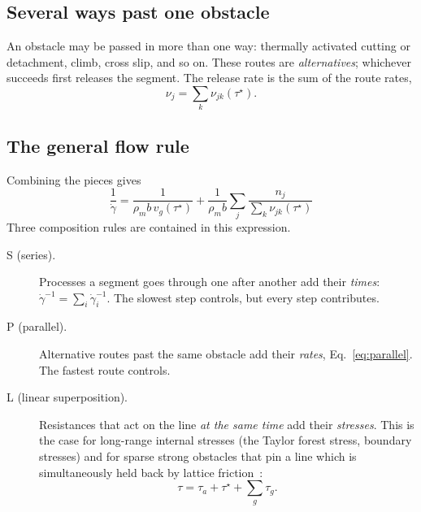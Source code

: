 \documentclass[11pt]{article}
\newcommand{\gd}{\dot\gamma}
\newcommand{\ts}{\tau^{\star}}
\numberwithin{equation}{section}
\begin{document}
\subsection{Several ways past one obstacle}
An obstacle may be passed in more than one way: thermally activated cutting or detachment, climb, cross slip, and so on. These routes are \emph{alternatives}; whichever succeeds first releases the segment. The release rate is the sum of the route rates,
\begin{equation}
\nu_j=\sum_k\nu_{jk}(\ts).
\label{eq:parallel}
\end{equation}

\subsection{The general flow rule}
Combining the pieces gives
\begin{equation}
\boxed{\;\frac{1}{\gd}=\frac{1}{\rho_m b\,v_g(\ts)}+\frac{1}{\rho_m b}\sum_j\frac{n_j}{\sum_k\nu_{jk}(\ts)}\;}
\label{eq:general}
\end{equation}
Three composition rules are contained in this expression.
\begin{description}
\item[S (series).] Processes a segment goes through one after another add their \emph{times}: $\gd^{-1}=\sum_i\gd_i^{-1}$. The slowest step controls, but every step contributes.
\item[P (parallel).] Alternative routes past the same obstacle add their \emph{rates}, Eq.~\eqref{eq:parallel}. The fastest route controls.
\item[L (linear superposition).] Resistances that act on the line \emph{at the same time} add their \emph{stresses}. This is the case for long-range internal stresses (the Taylor forest stress, boundary stresses) and for sparse strong obstacles that pin a line which is simultaneously held back by lattice friction~\cite{KocksArgonAshby,Seeger}:
\begin{equation}
\tau=\tau_a+\ts+\sum_g\tau_g .
\label{eq:superpose}
\end{equation}
\end{description}
\end{document}
